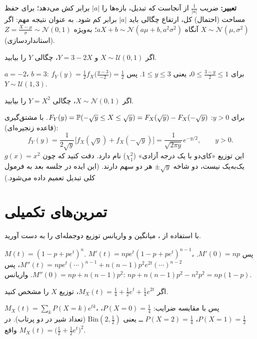 \begin{note}
\notetitle \textbf{تعبیر:} ضریب $\frac{1}{|a|}$ از آنجاست که تبدیل، بازه‌ها را $|a|$ برابر کش می‌دهد؛ برای حفظ مساحت (احتمال) کل، ارتفاع چگالی باید $|a|$ برابر کم شود. به عنوان نتیجه مهم: اگر $X\sim\mathcal N(\mu,\sigma^2)$ آنگاه $aX+b\sim\mathcal N(a\mu+b,a^2\sigma^2)$؛ به‌ویژه $Z=\frac{X-\mu}{\sigma}\sim\mathcal N(0,1)$ (استانداردسازی).
\end{note}

\begin{example}
اگر $X\sim\mathcal U(0,1)$ و $Y=3-2X$، چگالی $Y$ را بیابید.
\begin{solution}
$a=-2$، $b=3$: $f_Y(y)=\frac12f_X\big(\frac{y-3}{-2}\big)=\frac12$ برای $0\le\frac{3-y}{2}\le1$، یعنی $1\le y\le3$. پس $Y\sim\mathcal U(1,3)$.
\end{solution}
\end{example}

\begin{example}[یک تبدیل غیرخطی: $Y=X^2$]
اگر $X\sim\mathcal N(0,1)$، چگالی $Y=X^2$ را بیابید.
\begin{solution}
برای $y>0$: $F_Y(y)=\mathbb{P}(-\sqrt y\le X\le\sqrt y)=F_X(\sqrt y)-F_X(-\sqrt y)$. با مشتق‌گیری (قاعده زنجیره‌ای):
\[
f_Y(y)=\frac{1}{2\sqrt y}\big[f_X(\sqrt y)+f_X(-\sqrt y)\big]=\frac{1}{\sqrt{2\pi y}}e^{-y/2},\qquad y>0 .
\]
این توزیع «کای‌دو با یک درجه آزادی» ($\chi^2_1$) نام دارد. دقت کنید که چون $g(x)=x^2$ یک‌به‌یک نیست، دو شاخه $\pm\sqrt y$ هر دو سهم دارند. (این ایده در جلسه بعد به فرمول کلی تبدیل تعمیم داده می‌شود.)
\end{solution}
\end{example}

\section{تمرین‌های تکمیلی}

\begin{exercise}
با استفاده از ، میانگین و واریانس توزیع دوجمله‌ای را به دست آورید.
\end{exercise}
\begin{solution}
$M(t)=(1-p+pe^t)^n$. $M'(t)=npe^t(1-p+pe^t)^{n-1}$، پس $M'(0)=np$.
$M''(t)=npe^t(\cdots)^{n-1}+n(n-1)p^2e^{2t}(\cdots)^{n-2}$، پس $M''(0)=np+n(n-1)p^2$. واریانس: $np+n(n-1)p^2-n^2p^2=np(1-p)$.
\end{solution}

\begin{exercise}
اگر $M_X(t)=\frac{1}{4}+\frac12e^{t}+\frac14e^{2t}$، توزیع $X$ را مشخص کنید.
\end{exercise}
\begin{solution}
$M_X(t)=\sum_kP(X=k)e^{tk}$، پس با مقایسه ضرایب: $P(X=0)=\frac14$، $P(X=1)=\frac12$، $P(X=2)=\frac14$ ــ یعنی $\mathrm{Bin}(2,\frac12)$ (تعداد شیر در دو پرتاب). در واقع $M_X(t)=\big(\frac12+\frac12e^t\big)^2$.
\end{solution}

